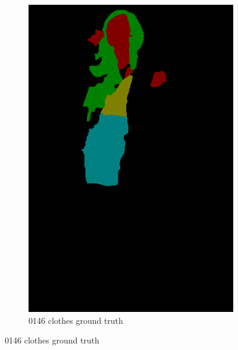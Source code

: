 \documentclass{csc_assignment5}
\begin{document}
\begin{description}
\begin{figure}[h!]
\begin{subfigure}[b]{0.3\textwidth}
        \includegraphics[width=\textwidth]{labels/0146_clothes.png}
        \caption{0146 clothes ground truth}
    \end{subfigure}
\end{figure}



\end{description}
\end{document}
